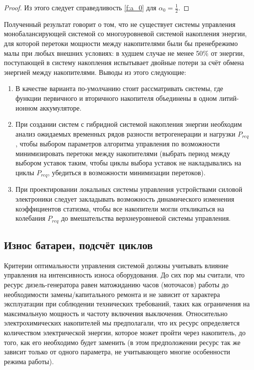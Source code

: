 \begin{proof}
Из этого следует справедливость \ref{f:a_0} для $\alpha_0 = \frac{1}{2}$.
\end{proof}

Полученный результат говорит о том, что не существует системы управления монобалансирующей системой со многоуровневой системой накопления энергии, для которой перетоки мощности между накопителями были бы пренебрежимо малы при любых внешних условиях: в худшем случае не менее 50\% от энергии, поступающей в систему накопления испытывает двойные потери за счёт обмена энергией между накопителями.
Выводы из этого следующие:

\begin{enumerate}
    \item В качестве варианта по-умолчанию стоит рассматривать системы, где функции первичного и вторичного накопителя объединены в одном литий-ионном аккумуляторе.
    
    \item При создании систем с гибридной системой накопления энергии необходим анализ ожидаемых временных рядов разности ветрогенерации и нагрузки $P_{req}$, чтобы выбором параметров алгоритма управления по возможности минимизировать перетоки между накопителями (выбрать период между выбором уставок таким, чтобы циклы выбора уставок не накладывались на циклы $P_{req}$, убедиться в возможности минимизации перетоков). 
    
    \item При проектировании локальных системы управления устройствами силовой электроники следует закладывать возможность динамического изменения коэффициентов статизма, чтобы все накопители могли откликаться на колебания $P_{req}$ до вмешательства верхнеуровневой системы управления.
\end{enumerate}



\subsection{Износ батареи, подсчёт циклов}

 

Критерии оптимальности управления системой должны учитывать влияние управления на интенсивность износа оборудования.
До сих пор мы считали, что ресурс дизель-генератора равен матожиданию часов (моточасов) работы до необходимости замены/капитального ремонта и не зависит от характера эксплуатации при соблюдении технических требований, таких как ограничения на максимальную мощность и частоту включения выключения.
Относительно электрохимических накопителей мы предполагали, что их ресурс определяется количеством электрической энергии, которое может пройти через накопитель, до того, как его необходимо будет заменить (в этом предположении ресурс так же зависит только от одного параметра, не учитывающего многие особенности режима работы).

